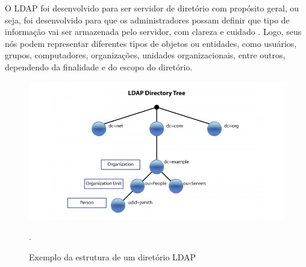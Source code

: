 O LDAP foi desenvolvido para ser servidor de diretório com propósito
geral, ou seja, foi desenvolvido para que os administradores possam
definir que tipo de informação vai ser armazenada pelo servidor, com clareza e
cuidado \cite{lima2021estudo}. Logo, seus nós podem representar diferentes tipos de objetos ou entidades, como usuários, grupos, computadores, organizações, unidades organizacionais, entre outros, dependendo da finalidade e do escopo do diretório.

\begin{figure}[h]
    \centering
	\includegraphics[scale=0.7]{projeto/textuais/LDAPTree.png}
	\caption[Exemplo da estrutura de um diretório LDAP]{Exemplo da estrutura de um diretório LDAP}.
	\label{fig:ldaptree}
\end{figure}

